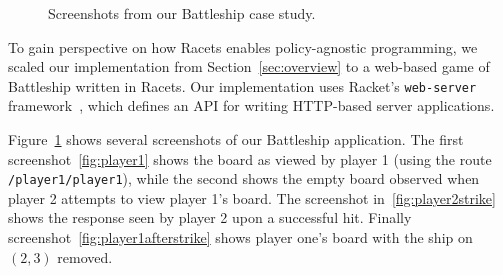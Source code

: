 \documentclass[review=true,acmlarge]{acmart}
\newcommand{\bmth}[1] {{\color{colorMATH} $#1$}}
\begin{document}
\begin{figure}
  \quad
  \quad
  \vspace{.3in}
  \quad
  \caption{Screenshots from our Battleship case study.}
  \label{fig:case}
\end{figure}

To gain perspective on how Racets enables policy-agnostic programming,
we scaled our implementation from Section~\ref{sec:overview} to a
web-based game of Battleship written in Racets. Our implementation
uses Racket's \texttt{web-server} framework~\cite{webserver}, which
defines an API for writing HTTP-based server applications. 

Figure~\ref{fig:case} shows several screenshots of our Battleship
application. The first screenshot~\ref{fig:player1} shows the board as
viewed by player 1 (using the route \texttt{/player1/player1}),
while the second shows the empty board observed when player 2 attempts
to view player 1's board. The screenshot in~\ref{fig:player2strike}
shows the response seen by player 2 upon a successful hit. Finally
screenshot~\ref{fig:player1afterstrike} shows player one's board with
the ship on \bmth{(2,3)} removed.
\end{document}
